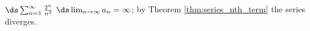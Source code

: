{$\ds \sum_{n=1}^\infty \frac{2^n}{n^2}$
}
{$\ds \lim_{n\to\infty}a_n = \infty$; by Theorem \ref{thm:series_nth_term} the series diverges.
}